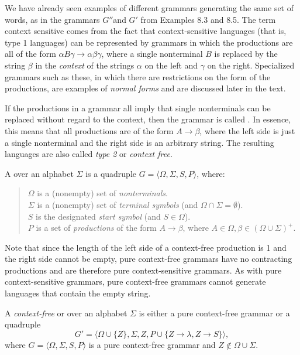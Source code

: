 We have already seen examples of different grammars generating the same set
of words, as in the grammars $G''$and $G'$ from Examples 8.3 and 8.5. The term
context sensitive comes from the fact that context-sensitive languages (that
is, type 1 languages) can be represented by grammars in which the productions
are all of the form $\alpha B\gamma\rightarrow\alpha\beta\gamma$, where a single
nonterminal $B$ is replaced by the string $\beta$ in the \emph{context} of the strings
$\alpha$ on the left and $\gamma$ on the right. Specialized grammars such as
these, in which there are restrictions on the form of the productions, are
examples of \emph{normal forms} and are discussed later in the text.

If the productions in a grammar all imply that single nonterminals can be
replaced without regard to the context, then the grammar is called
\emph{}. In essence, this means that all productions are of
the form $A\rightarrow\beta$, where the left side is just a single nonterminal
and the right side is an arbitrary string. The resulting languages are also
called \emph{type 2} or \emph{context free}.

\begin{dfn}\label{dfn-8.5}
A \emph{} over an alphabet $\Sigma$ is a
quadruple $G=\langle\Omega,\Sigma,S,P\rangle$, where:

\begin{quote}
$\Omega$ is a (nonempty) set of \emph{nonterminals}. \\
$\Sigma$ is a (nonempty) set of \emph{terminal symbols} (and $\Omega\cap\Sigma =
	\emptyset$). \\
$S$ is the designated \emph{start symbol} (and $S\in\Omega$). \\
$P$ is a set of \emph{productions} of the form $A\rightarrow\beta$, where $A\in\Omega,
	\beta\in(\Omega\cup\Sigma)^+$.
\end{quote}
\end{dfn}
Note that since the length of the left side of a context-free production is 1
and the right side cannot be empty, pure context-free grammars have no
contracting productions and are therefore pure context-sensitive grammars. As
with pure context-sensitive grammars, pure context-free grammars cannot generate
languages that contain the empty string.

\begin{dfn}\label{dfn-8.6}
A \emph{context-free} or \emph{} over an alphabet $\Sigma$
is either a pure context-free grammar or a quadruple
\[ G' = \langle\Omega\cup\{Z\},\Sigma,Z,P\cup\{Z\rightarrow\lambda,Z\rightarrow
	S\}\rangle, \]
where $G=\langle\Omega,\Sigma,S,P\rangle$ is a pure context-free grammar and
$Z \not \in \Omega\cup\Sigma$.
\end{dfn}

